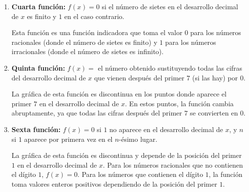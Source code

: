 \begin{enumerate}
    \item \textbf{Cuarta función:} $f(x) = 0$ si el número de sietes en el desarrollo decimal de $x$ es finito y $1$ en el caso contrario.
    
    Esta función es una función indicadora que toma el valor $0$ para los números racionales (donde el número de sietes es finito) y $1$ para los números irracionales (donde el número de sietes es infinito).

    \item \textbf{Quinta función:} $f(x) =$ el número obtenido sustituyendo todas las cifras del desarrollo decimal de $x$ que vienen después del primer $7$ (si las hay) por $0$.
    
    La gráfica de esta función es discontinua en los puntos donde aparece el primer $7$ en el desarrollo decimal de $x$. En estos puntos, la función cambia abruptamente, ya que todas las cifras después del primer $7$ se convierten en $0$.

    \item \textbf{Sexta función:} $f(x) = 0$ si $1$ no aparece en el desarrollo decimal de $x$, y $n$ si $1$ aparece por primera vez en el $n$-ésimo lugar.
    
    La gráfica de esta función es discontinua y depende de la posición del primer $1$ en el desarrollo decimal de $x$. Para los números racionales que no contienen el dígito $1$, $f(x) = 0$. Para los números que contienen el dígito $1$, la función toma valores enteros positivos dependiendo de la posición del primer $1$.
\end{enumerate}

